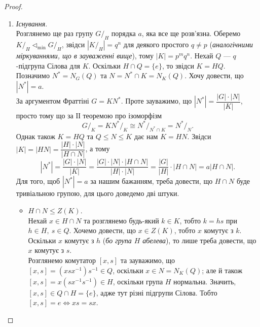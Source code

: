 \documentclass{math_library}
\begin{document}
\begin{proof}
\begin{enumerate}[topsep=0pt,wide=0pt,label={\roman*.}]
\item \textit{Існування}.\\
Розглянемо ще раз групу $G/_H$ порядка $a$, яка все ще розв'язна. Оберемо $K/_H \triangleleft_{\text{min}} G/_H$, звідси $|K/_H| = q^n$ для деякого простого $q \neq p$ (\textit{аналогічними міркуваннями, що в зауваженні вище}), тому $|K| = p^m q^n$. Нехай $Q$ --- $q$-підгрупа Сілова для $K$. Оскільки $H \cap Q = \{e\}$, то звідси $K = HQ$. Позначимо $N^* = N_G(Q)$ та $N = N^* \cap K = N_K(Q)$. Хочу довести, що $|N^*| = a$.\\
За аргументом Фраттіні $G = KN^*$. Проте зауважимо, що $|N^*| = \dfrac{|G| \cdot |N|}{|K|}$, просто тому що за ІІ теоремою про ізоморфізм
\[
G/_K = KN^*/_K \cong N^*/_{N^* \cap K} = N^*/_N.
\]
Однак також $K = HQ$ та $Q \leq N \leq K$ дає нам $K = HN$. Звідси $|K| = |HN| = \dfrac{|H| \cdot |N|}{|H \cap N|}$, а тому
\[
|N^*| = \dfrac{|G| \cdot |N|}{|K|} = \dfrac{|G| \cdot |N| \cdot |H \cap N|}{|H| \cdot |N|} = \dfrac{|G|}{|H|} \cdot |H \cap N| = a |H \cap N|.
\]
Для того, щоб $|N^*| = a$ за нашим бажанням, треба довести, що $H \cap N$ буде тривіальною групою, для цього доведемо дві штуки.
\begin{itemize}
\item $H \cap N \leq Z(K)$.\\
Нехай $x \in H \cap N$ та розглянемо будь-який $k \in K$, тобто $k = hs$ при $h \in H,\ s \in Q$. Хочемо довести, що $x \in Z(K)$, тобто $x$ комутує з $k$. Оскільки $x$ комутує з $h$ (\textit{бо група $H$ абелева}), то лише треба довести, що $x$ комутує з $s$.\\
Розглянемо комутатор $[x,s]$ та зауважимо, що $[x,s] = (xsx^{-1})s^{-1} \in Q$, оскільки $x \in N = N_K(Q)$; але й також $[x,s] = x(sx^{-1}s^{-1}) \in H$, оскільки група $H$ нормальна. Значить, $[x,s] \in Q \cap H = \{e\}$, адже тут різні підгрупи Сілова. Тобто $[x,s] = e \iff xs = sx$.


\end{itemize}
\end{enumerate}
\end{proof}
\end{document}
